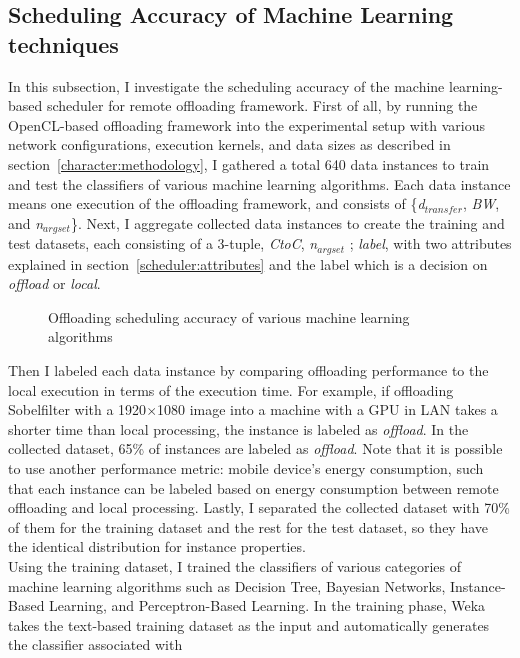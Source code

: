 \subsection{Scheduling Accuracy of Machine Learning techniques}
\label{scheduler:accuracy}
%
In this subsection, I investigate the scheduling accuracy of the machine
learning-based scheduler for remote offloading framework.
%
First of all, by running the OpenCL-based offloading framework into the
experimental setup with various network configurations, execution
kernels, and data sizes as described in
section~\ref{character:methodology}, I gathered a total 640 data
instances to train and test the classifiers of various machine learning
algorithms.
%
Each data instance means one execution of the offloading framework, and
consists of \{{\it d$_{transfer}$}, {\it BW}, and {\it n$_{argset}$}\}.
%
Next, I aggregate collected data instances to create the training and
test datasets, each consisting of a 3-tuple, {{\it CtoC}, {\it
n$_{argset}$} ; {\it label}}, with two attributes explained in
section~\ref{scheduler:attributes} and the label which is a decision on
{\it offload} or {\it local}.
%
\begin{figure}
\centering
{}
\caption{Offloading scheduling accuracy of various machine learning
algorithms}
\label{fig:scheduling_accuracy}
\end{figure}
%
Then I labeled each data instance by comparing offloading 
performance to the local execution in terms of the execution time.
%
For example, if offloading Sobelfilter with a 1920$\times$1080 image
into a machine with a GPU in LAN takes a shorter time than
local processing, the instance is labeled as \textit{offload}.
%
In the collected dataset, 65\% of instances are labeled as
\textit{offload}.
%
Note that it is possible to use another performance metric: mobile
device's energy consumption, such that each instance can be labeled
based on energy consumption between remote offloading and local
processing.
%
Lastly, I separated the collected dataset with 70\% of them for
the training dataset and the rest for the test dataset, so they have
the identical distribution for instance properties.\\
%
Using the training dataset, I trained the classifiers of various
categories of machine learning algorithms such as Decision Tree,
Bayesian Networks, Instance-Based Learning, and Perceptron-Based
Learning. 
%
In the training phase, Weka takes the text-based training dataset as
the input and automatically generates the classifier associated with
